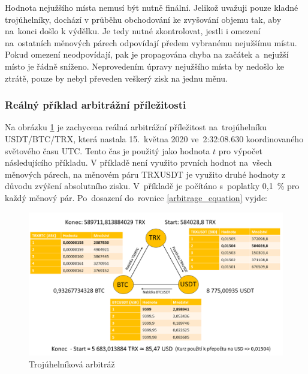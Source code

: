 \documentclass[thesis=B,czech]{FITthesis}[2019/03/21]
\begin{document}
Hodnota nejužšího místa nemusí být nutně finální. Jelikož uvažuji pouze kladné trojúhelníky, dochází v průběhu obchodování ke zvyšování objemu tak, aby na~konci došlo k výdělku. Je tedy nutné zkontrolovat, jestli i omezení na~ostatních měnových párech odpovídají předem vybranému nejužšímu místu. Pokud omezení neodpovídají, pak je propagována chyba na začátek a~nejužší místo je řádně sníženo. Neprovedením úpravy nejužšího místa by nedošlo ke ztrátě, pouze by nebyl převeden veškerý zisk na jednu měnu.

\subsubsection{Reálný příklad arbitrážní příležitosti}
Na obrázku \ref{triangle_arbitrage} je zachycena reálná arbitrážní příležitost na~trojúhelníku USDT/BTC/TRX, která nastala 15.~května 2020 ve~2:32:08.630  \linebreak koordinovaného světového času UTC. Tento čas je použitý jako hodnota \(t\) pro výpočet následujícího příkladu. V příkladě není využito prvních hodnot na~všech měnových párech, na měnovém páru TRXUSDT je využito druhé hodnoty z důvodu zvýšení absolutního zisku. V~příkladě je počítáno s~poplatky 0,1~\% pro každý měnový pár. Po~dosazení do~rovnice \ref{arbitrage_equation} vyjde:

\begin{figure}\centering
	\includegraphics[width=1\textwidth]{images/triangle2.png}
	\caption{Trojúhelníková arbitráž}\label{triangle_arbitrage}
\end{figure}

\end{document}
